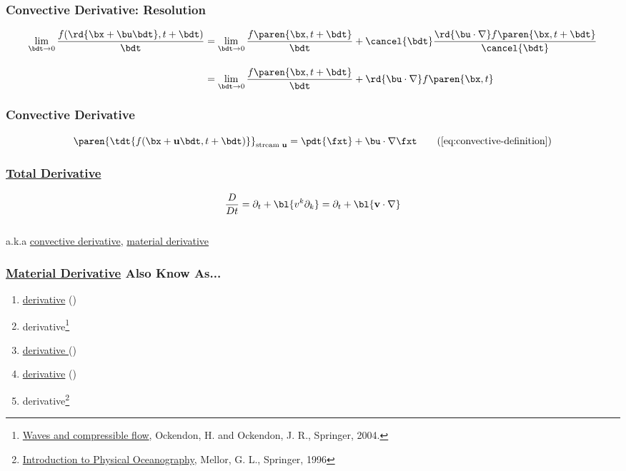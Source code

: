 %
\begin{frame}\frametitle{Convective Derivative: Resolution}
\center
\begin{equation}
\begin{split}
	\lim\limits_{\bdt \to 0} \frac{ f(\rd{\bx + \bu \bdt}, t + \bdt) } { \bdt }
		&= \lim\limits_{\bdt \to 0} \frac{ f\paren{\bx, t + \bdt} } { \bdt } + \cancel{\bdt} \frac{ \rd{\bu \cdot \nabla} f\paren{\bx, t + \bdt} } { \cancel{\bdt} } \\[10pt]
		&= \lim\limits_{\bdt \to 0} \frac{ f\paren{\bx, t + \bdt} } { \bdt } + \rd{\bu \cdot \nabla} f\paren{\bx,t}
\end{split}
\label{eq:convective-definition-resolution-term}
\end{equation}
\end{frame}
%
\begin{frame}\frametitle{Convective Derivative}
\begin{equation}
	\paren{\tdt{f(\bx+ \mathbf{u}\bdt, t+\bdt)}}_{\text{stream }\mathbf{u}} 
		= \pdt{\fxt} + \bu \cdot \nabla \fxt
\tag{\ref{eq:convective-definition}}
\end{equation}
\end{frame}
%
\begin{frame}\frametitle{\href{https://mathworld.wolfram.com/TotalDerivative.html}{Total Derivative}}
\begin{equation}
	\frac{D}{Dt} = \partial_{t} + \bl{v^{k}\partial_{k}} = \partial_{t} + \bl{\mathbf{v} \cdot \nabla}	
\label{eq:total derivative}
\end{equation}
\ \\[20pt]
a.k.a \href{https://mathworld.wolfram.com/ConvectiveDerivative.html}{convective derivative}, \href{https://en.wikipedia.org/wiki/Material_derivative}{material derivative}
%
\end{frame}
%
%
\begin{frame}\frametitle{\href{https://en.wikipedia.org/wiki/Material_derivative}{Material Derivative} Also Know As...}
\begin{enumerate}
	\item \href{https://bookstore.ams.org/view?ProductCode=CLN/9}{ derivative} (\cite{majda2003introduction})
	\item {} derivative\footnote{\href{https://link.springer.com/book/10.1007/b97537}{Waves and compressible flow}, Ockendon, H. and Ockendon, J. R., Springer, 2004.} 
	\item \href{https://www.google.com/books/edition/Transport_Phenomena/L5FnNlIaGfcC?hl=en}{derivative } (\cite{bird2002transport})
	\item \href{https://www.google.com/books/edition/Transport_Phenomena/L5FnNlIaGfcC?hl=en}{ derivative} (\cite{bird2002transport})
	\item {} derivative\footnote{\href{https://link.springer.com/book/9781563962103}{Introduction to Physical Oceanography}, Mellor, G. L., Springer, 1996}
	\seti
\end{enumerate}
\end{frame}
